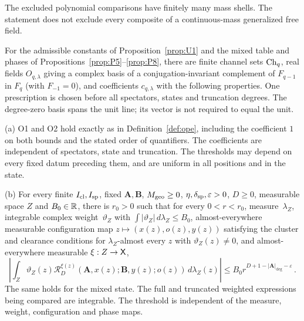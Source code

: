 \begin{remark}
The excluded polynomial comparisons have finitely many mass shells. The statement does not exclude every composite of a continuous-mass generalized free field.
\end{remark}

\begin{proposition}\label{prop:P12}
For the admissible constants of Proposition~\ref{prop:U1} and the mixed table and phases of Propositions~\ref{prop:P5}--\ref{prop:P8}, there are finite channel sets $\mathrm{Ch}_{q}$, real fields $O_{q,\lambda}$ giving a complex basis of a conjugation-invariant complement of $F_{q-1}$ in $F_q$ (with $F_{-1}=0$), and coefficients $c_{q,\lambda}$ with the following properties. One prescription is chosen before all spectators, states and truncation degrees. The degree-zero basis spans the unit line; its vector is not required to equal the unit.

(a) O1 and O2 hold exactly as in Definition~\ref{def:ope}, including the coefficient $1$ on both bounds and the stated order of quantifiers. The coefficients are independent of spectators, state and truncation. The thresholds may depend on every fixed datum preceding them, and are uniform in all positions and in the state.

(b) For every finite $I_{\rm cl},I_{\rm sp}$, fixed $\boldsymbol A,\boldsymbol B$, $M_{\rm geo}\ge0$, $\eta,\delta_{\rm sp},\varepsilon>0$, $D\ge0$, measurable space $Z$ and $B_0\in\mathbb{R}$, there is $r_0>0$ such that for every $0<r<r_0$, measure~$\lambda_Z$, integrable complex weight~$\vartheta_Z$ with $\int|\vartheta_Z|\,d\lambda_Z\le B_0$, almost-everywhere measurable configuration map $z\mapsto(x(z),o(z),y(z))$ satisfying the cluster and clearance conditions for $\lambda_Z$-almost every $z$ with $\vartheta_Z(z)\ne0$, and almost-everywhere measurable $\xi:Z\to\mathsf{X}$,
\begin{equation}\label{eq:P12-1}
\left|\int_Z\vartheta_Z(z)\mathcal R_D^{\xi(z)}(\boldsymbol A,x(z);\boldsymbol B,y(z);o(z))\,d\lambda_Z(z)\right|\le B_0r^{D+1-|\boldsymbol A|_{\deg}-\varepsilon}\,.
\end{equation}
The same holds for the mixed state. The full and truncated weighted expressions being compared are integrable. The threshold is independent of the measure, weight, configuration and phase maps.


\end{proposition}
